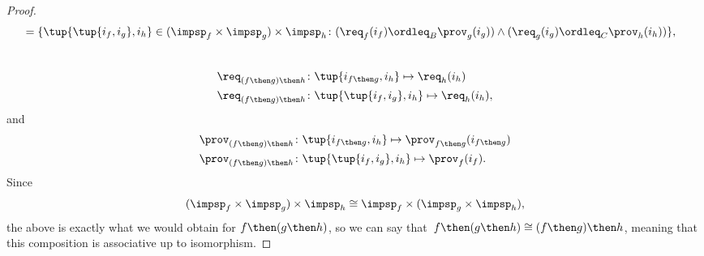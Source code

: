 \begin{proof}
\begin{equation}
\begin{aligned}
             & =\{
            \tup{\tup{i_f, i_g},i_h} \in (\impsp_f \times \impsp_g) \times \impsp_{h}\colon
            (\req_f(i_f) \ordleq_{B} \prov_g(i_g))
            \wedge
            (\req_g(i_g) \ordleq_{C} \prov_h(i_h))
            \},
        \end{aligned}
    \end{equation}
    ~
    \begin{equation}
        \begin{aligned}
            \req_{(f\then g)\then h} & \colon  \tup{i_{f\then g},i_h} \mapsto \req_h(i_h) \\
            \req_{(f\then g)\then h} & \colon  \tup{\tup{i_f, i_g},i_h} \mapsto \req_h(i_h),
        \end{aligned}
    \end{equation}
    and
    \begin{equation}
        \begin{aligned}
            \prov_{(f\then g)\then h} & \colon  \tup{i_{f\then g},i_h} \mapsto \prov_{f\then g}(i_{f\then g}) \\
            \prov_{(f\then g)\then h} & \colon  \tup{\tup{i_f, i_g},i_h} \mapsto \prov_f(i_f).
        \end{aligned}
    \end{equation}
    Since
    \begin{equation}
        (\impsp_f \times \impsp_g)
        \times \impsp_{h} \cong  \impsp_f \times (\impsp_g \times \impsp_{h}),
    \end{equation}
    the above is exactly what we would obtain for $f\then (g\then h)$, so we can say that~$f\then(g\then h)\cong (f\then g)\then h$, meaning that this composition is associative up to isomorphism.
\end{proof}

